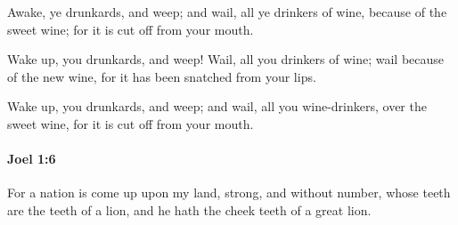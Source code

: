 			\begin{versebox}
					\item[BHS] 
					\item[LXX] 
					\item[ASV] Awake, ye drunkards, and weep; and wail, all ye drinkers of wine, because of the sweet wine; for it is cut off from your mouth.
					\item[NIV] Wake up, you drunkards, and weep! Wail, all you drinkers of wine; wail because of the new wine, for it has been snatched from your lips.
					\item[NRSV] Wake up, you drunkards, and weep; and wail, all you wine-drinkers, over the sweet wine, for it is cut off from your mouth.
			\end{versebox}

		\paragraph{Joel 1:6} %
			\label{JOEL-1-6}

			For a nation is come up upon my land, strong, and without number, whose teeth are the teeth of a lion, and he hath the cheek teeth of a great lion.

